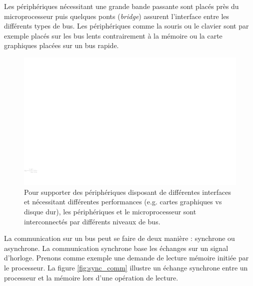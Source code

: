 Les périphériques nécessitant une grande bande passante sont placés près du microprocesseur puis quelques ponts (\emph{bridge}) assurent l'interface entre les différents types de bus. Les périphériques comme la souris ou le clavier sont par exemple placés sur les bus lents contrairement à la mémoire ou la carte graphiques placées sur un bus rapide.

\begin{figure}[htbp]
\includegraphics[width=\linewidth]{Figs/buses.pdf}
\caption{\label{fig:buses} Pour supporter des périphériques disposant de différentes interfaces et nécessitant différentes performances (e.g. cartes graphiques vs disque dur), les périphériques et le microprocesseur sont interconnectés par différents niveaux de bus.}
\end{figure}

La communication sur un bus peut se faire de deux manière : synchrone ou asynchrone. La communication synchrone base les échanges sur un signal d'horloge. Prenons comme exemple une demande de lecture mémoire initiée par le processeur. La figure \ref{fig:sync_comm} illustre un échange synchrone entre un processeur et la mémoire lors d'une opération de lecture.


